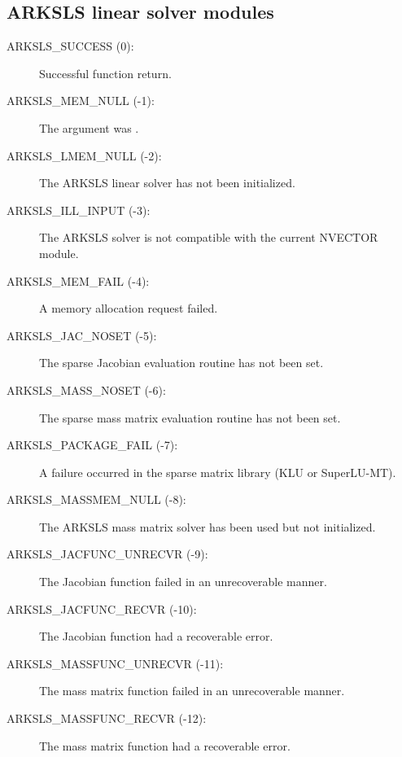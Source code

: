 \documentclass[letterpaper,10pt,english]{sphinxmanual}
\begin{document}
\subsection{ARKSLS linear solver modules}
\label{Constants:arksls-linear-solver-modules}\begin{description}
\item[{ARKSLS\_SUCCESS  (0):}] \leavevmode
Successful function return.

\item[{ARKSLS\_MEM\_NULL  (-1):}] \leavevmode
The  argument was .

\item[{ARKSLS\_LMEM\_NULL  (-2):}] \leavevmode
The ARKSLS linear solver has not been initialized.

\item[{ARKSLS\_ILL\_INPUT  (-3):}] \leavevmode
The ARKSLS solver is not compatible with the current NVECTOR module.

\item[{ARKSLS\_MEM\_FAIL  (-4):}] \leavevmode
A memory allocation request failed.

\item[{ARKSLS\_JAC\_NOSET  (-5):}] \leavevmode
The sparse Jacobian evaluation routine has not been set.

\item[{ARKSLS\_MASS\_NOSET  (-6):}] \leavevmode
The sparse mass matrix evaluation routine has not been set.

\item[{ARKSLS\_PACKAGE\_FAIL  (-7):}] \leavevmode
A failure occurred in the sparse matrix library (KLU or SuperLU-MT).

\item[{ARKSLS\_MASSMEM\_NULL  (-8):}] \leavevmode
The ARKSLS mass matrix solver has been used but not initialized.

\item[{ARKSLS\_JACFUNC\_UNRECVR  (-9):}] \leavevmode
The Jacobian function failed in an unrecoverable manner.

\item[{ARKSLS\_JACFUNC\_RECVR  (-10):}] \leavevmode
The Jacobian function had a recoverable error.

\item[{ARKSLS\_MASSFUNC\_UNRECVR  (-11):}] \leavevmode
The mass matrix function failed in an unrecoverable manner.

\item[{ARKSLS\_MASSFUNC\_RECVR  (-12):}] \leavevmode
The mass matrix function had a recoverable error.

\end{description}
\end{document}
